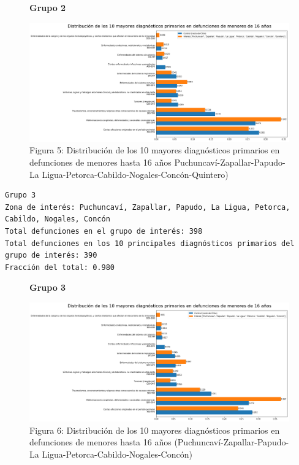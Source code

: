 \documentclass[]{article}
\begin{document}
\begin{figure}
\centering
\textbf{Grupo 2}\par\medskip
\includegraphics{assets/10-diagnosticos-(Puchuncavi-Zapallar-Papudo-LaLigua-Petorca-Cabildo-Nogales-Concon-Quintero).png}
\caption{Figura 5: Distribución de los 10 mayores diagnósticos primarios en defunciones de menores hasta 16 años Puchuncaví-Zapallar-Papudo-La Ligua-Petorca-Cabildo-Nogales-Concón-Quintero)}
\end{figure}

\begin{verbatim}
Grupo 3
Zona de interés: Puchuncaví, Zapallar, Papudo, La Ligua, Petorca, Cabildo, Nogales, Concón
Total defunciones en el grupo de interés: 398
Total defunciones en los 10 principales diagnósticos primarios del grupo de interés: 390
Fracción del total: 0.980
\end{verbatim}

\begin{figure}
\centering
\textbf{Grupo 3}\par\medskip
\includegraphics{assets/10-diagnosticos-(Puchuncavi-Zapallar-Papudo-LaLigua-Petorca-Cabildo-Nogales-Concon).png}
\caption{Figura 6: Distribución de los 10 mayores diagnósticos primarios en defunciones de menores hasta 16 años (Puchuncaví-Zapallar-Papudo-La Ligua-Petorca-Cabildo-Nogales-Concón)}
\end{figure}
\end{document}
